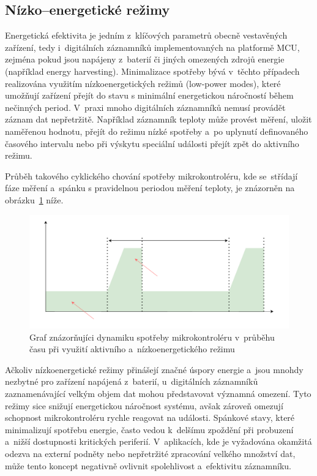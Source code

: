 \subsection{Nízko--energetické režimy}
\label{nizko_energeticke_rezimy}
Energetická efektivita je jedním z~klíčových parametrů obecně vestavěných zařízení, tedy i~digitálních záznamníků implementovaných na platformě MCU, zejména pokud jsou napájeny z~baterií či jiných omezených zdrojů energie (například energy harvesting). Minimalizace spotřeby bývá v~těchto případech realizována využitím nízkoenergetických režimů (low-power modes), které umožňují zařízení přejít do stavu s minimální energetickou náročností během nečinných period. V~praxi mnoho digitálních záznamníků nemusí provádět záznam dat nepřetržitě. Například záznamník teploty může provést měření, uložit naměřenou hodnotu, přejít do režimu nízké spotřeby a~po uplynutí definovaného časového intervalu nebo při výskytu speciální události přejít zpět do aktivního režimu.~\cite{analog_devices_low_power_modes}

Průběh takového cyklického chování spotřeby mikrokontroléru, kde se~střídají fáze měření a~spánku s pravidelnou periodou měření teploty, je znázorněn na obrázku~\ref{fig:low-power-modes} níže.

\begin{figure}[h]
    \centering
    \includegraphics[width=1.00\textwidth]{obrazky-figures/low_power_modes-cz.pdf}
    
    \caption{Graf znázorňujíci dynamiku spotřeby mikrokontroléru v~průběhu času při využití aktivního a~nízkoenergetického režimu~\cite{analog_devices_low_power_modes}}
    \label{fig:low-power-modes}
\end{figure}

Ačkoliv nízkoenergetické režimy přinášejí značné úspory energie a~jsou mnohdy nezbytné pro zařízení napájená z~baterií, u~digitálních záznamníků zaznamenávající velkým objem dat mohou představovat významná omezení. Tyto režimy sice snižují energetickou náročnost systému, avšak zároveň omezují schopnost mikrokontroléru rychle reagovat na události. Spánkové stavy, které minimalizují spotřebu energie, často vedou k~delšímu zpoždění při probuzení a~nižší dostupnosti kritických periferií. V~aplikacích, kde je vyžadována okamžitá odezva na externí podněty nebo nepřetržité zpracování velkého množství dat, může tento koncept negativně ovlivnit spolehlivost a~efektivitu záznamníku.~\cite{embedded_low_power_modes}

